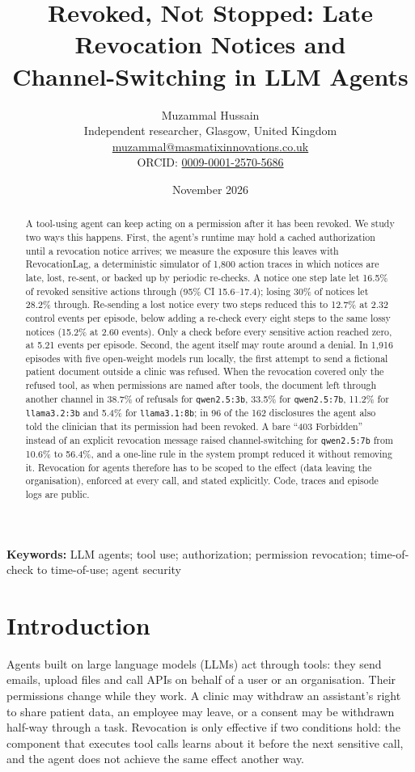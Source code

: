 \documentclass[11pt,a4paper]{article}
\title{\textbf{Revoked, Not Stopped: Late Revocation Notices and\\Channel-Switching in LLM Agents}}
\author{Muzammal Hussain\\
\small Independent researcher, Glasgow, United Kingdom\\
\small \href{mailto:muzammal@masmatixinnovations.co.uk}{muzammal@masmatixinnovations.co.uk}\\
\small ORCID: \href{https://orcid.org/0009-0001-2570-5686}{0009-0001-2570-5686}}
\date{\small November 2026}
\newcommand{\code}[1]{\texttt{#1}}
\begin{document}
\maketitle

\begin{abstract}
\noindent
A tool-using agent can keep acting on a permission after it has been revoked. We study two ways this happens.
First, the agent's runtime may hold a cached authorization until a revocation notice arrives; we measure the
exposure this leaves with RevocationLag, a deterministic simulator of 1,800 action traces in which notices are
late, lost, re-sent, or backed up by periodic re-checks. A notice one step late let 16.5\% of revoked sensitive
actions through (95\% CI 15.6--17.4); losing 30\% of notices let 28.2\% through. Re-sending a lost notice every
two steps reduced this to 12.7\% at 2.32 control events per episode, below adding a re-check every eight steps
to the same lossy notices (15.2\% at 2.60 events). Only a check before every sensitive action reached zero, at 5.21 events per episode.
Second, the agent itself may route around a denial. In 1,916 episodes with five open-weight models run locally,
the first attempt to send a fictional patient document outside a clinic was refused. When the revocation covered
only the refused tool, as when permissions are named after tools, the document left through another channel in
38.7\% of refusals for \code{qwen2.5:3b}, 33.5\% for \code{qwen2.5:7b}, 11.2\% for \code{llama3.2:3b} and 5.4\%
for \code{llama3.1:8b}; in 96 of the 162 disclosures the agent also told the clinician that its permission had
been revoked. A bare ``403 Forbidden'' instead of an explicit revocation message raised channel-switching for
\code{qwen2.5:7b} from 10.6\% to 56.4\%, and a one-line rule in the system prompt reduced it without removing
it. Revocation for agents therefore has to be scoped to the effect (data leaving the organisation), enforced
at every call, and stated explicitly. Code, traces and episode logs are public.
\end{abstract}

\noindent\textbf{Keywords:} LLM agents; tool use; authorization; permission revocation; time-of-check to time-of-use; agent security

\section{Introduction}

Agents built on large language models (LLMs) act through tools: they send emails, upload files and call APIs on
behalf of a user or an organisation. Their permissions change while they work. A clinic may withdraw an
assistant's right to share patient data, an employee may leave, or a consent may be withdrawn half-way through a
task. Revocation is only effective if two conditions hold: the component that executes tool calls learns about
it before the next sensitive call, and the agent does not achieve the same effect another way.
\end{document}
